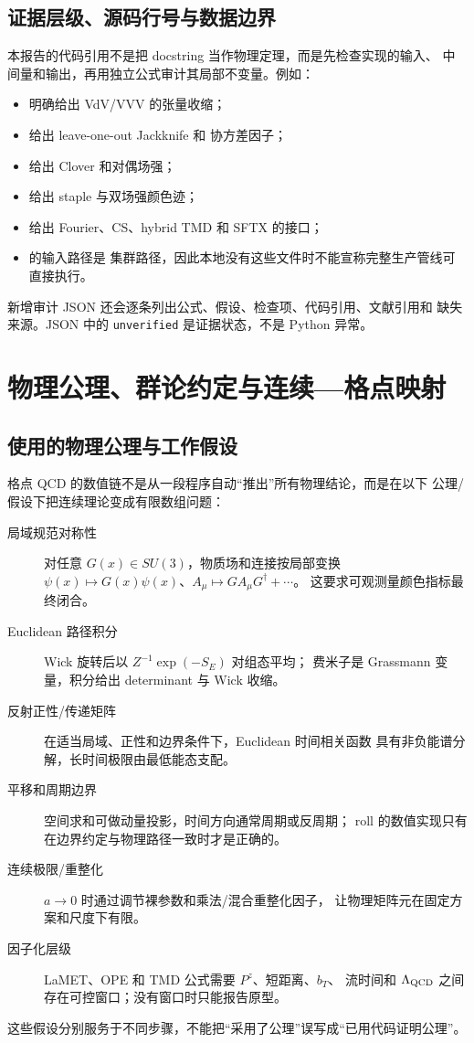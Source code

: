 \documentclass[UTF8,11pt,oneside]{ctexbook}
\begin{document}
\section{证据层级、源码行号与数据边界}
本报告的代码引用不是把 docstring 当作物理定理，而是先检查实现的输入、
中间量和输出，再用独立公式审计其局部不变量。例如：
\begin{itemize}
  \item {} 明确给出 VdV/VVV 的张量收缩；
  \item {} 给出 leave-one-out Jackknife 和
  协方差因子；
  \item {} 给出 Clover 和对偶场强；
  \item {} 给出 staple 与双场强颜色迹；
  \item {} 给出 Fourier、CS、hybrid
  TMD 和 SFTX 的接口；
  \item {} 的输入路径是 
  集群路径，因此本地没有这些文件时不能宣称完整生产管线可直接执行。
\end{itemize}
新增审计 JSON 还会逐条列出公式、假设、检查项、代码引用、文献引用和
缺失来源。JSON 中的 \texttt{unverified} 是证据状态，不是 Python 异常。

\chapter{物理公理、群论约定与连续—格点映射}

\section{使用的物理公理与工作假设}
\label{sec:axioms}
格点 QCD 的数值链不是从一段程序自动“推出”所有物理结论，而是在以下
公理/假设下把连续理论变成有限数组问题：
\begin{description}
  \item[局域规范对称性] 对任意 \(G(x)\in SU(3)\)，物质场和连接按局部变换
  \(\psi(x)\mapsto G(x)\psi(x)\)、\(A_\mu\mapsto G A_\mu G^\dagger+\cdots\)。
  这要求可观测量颜色指标最终闭合。
  \item[Euclidean 路径积分] Wick 旋转后以 \(Z^{-1}\exp(-S_E)\) 对组态平均；
  费米子是 Grassmann 变量，积分给出 determinant 与 Wick 收缩。
  \item[反射正性/传递矩阵] 在适当局域、正性和边界条件下，Euclidean 时间相关函数
  具有非负能谱分解，长时间极限由最低能态支配。
  \item[平移和周期边界] 空间求和可做动量投影，时间方向通常周期或反周期；
  \(\mathrm{roll}\) 的数值实现只有在边界约定与物理路径一致时才是正确的。
  \item[连续极限/重整化] \(a\to0\) 时通过调节裸参数和乘法/混合重整化因子，
  让物理矩阵元在固定方案和尺度下有限。
  \item[因子化层级] LaMET、OPE 和 TMD 公式需要 \(P^z\)、短距离、\(b_T\)、
  流时间和 \(\Lambda_{\rm QCD}\) 之间存在可控窗口；没有窗口时只能报告原型。
\end{description}
这些假设分别服务于不同步骤，不能把“采用了公理”误写成“已用代码证明公理”。
\end{document}
